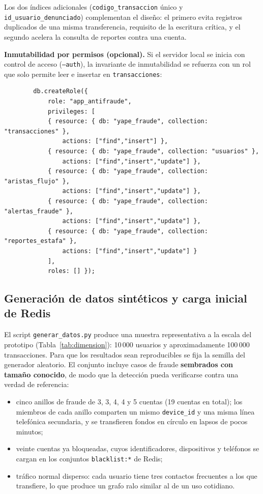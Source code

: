 \documentclass[11pt,a4paper]{article}
\begin{document}
	Los dos índices adicionales (\texttt{codigo\_transaccion} único y \texttt{id\_usuario\_denunciado}) complementan el diseño: el primero evita registros duplicados de una misma transferencia, requisito de la escritura crítica, y el segundo acelera la consulta de reportes contra una cuenta.
	
	\textbf{Inmutabilidad por permisos (opcional).} Si el servidor local se inicia con control de acceso (\texttt{--auth}), la invariante de inmutabilidad se refuerza con un rol que solo permite leer e insertar en \texttt{transacciones}:
	\begin{lstlisting}
		db.createRole({
			role: "app_antifraude",
			privileges: [
			{ resource: { db: "yape_fraude", collection: "transacciones" },
				actions: ["find","insert"] },
			{ resource: { db: "yape_fraude", collection: "usuarios" },
				actions: ["find","insert","update"] },
			{ resource: { db: "yape_fraude", collection: "aristas_flujo" },
				actions: ["find","insert","update"] },
			{ resource: { db: "yape_fraude", collection: "alertas_fraude" },
				actions: ["find","insert","update"] },
			{ resource: { db: "yape_fraude", collection: "reportes_estafa" },
				actions: ["find","insert","update"] }
			],
			roles: [] });
	\end{lstlisting}
	
	\subsection{Generación de datos sintéticos y carga inicial de Redis}
	El script \texttt{generar\_datos.py} produce una muestra representativa a la escala del prototipo (Tabla~\ref{tab:dimension}): 10\,000 usuarios y aproximadamente 100\,000 transacciones. Para que los resultados sean reproducibles se fija la semilla del generador aleatorio. El conjunto incluye casos de fraude \textbf{sembrados con tamaño conocido}, de modo que la detección pueda verificarse contra una verdad de referencia:
	\begin{itemize}[leftmargin=2em]
		\item cinco anillos de fraude de 3, 3, 4, 4 y 5 cuentas (19 cuentas en total); los miembros de cada anillo comparten un mismo \texttt{device\_id} y una misma línea telefónica secundaria, y se transfieren fondos en círculo en lapsos de pocos minutos;
		\item veinte cuentas ya bloqueadas, cuyos identificadores, dispositivos y teléfonos se cargan en los conjuntos \texttt{blacklist:*} de Redis;
		\item tráfico normal disperso: cada usuario tiene tres contactos frecuentes a los que transfiere, lo que produce un grafo ralo similar al de un uso cotidiano.
	\end{itemize}
	
\end{document}
